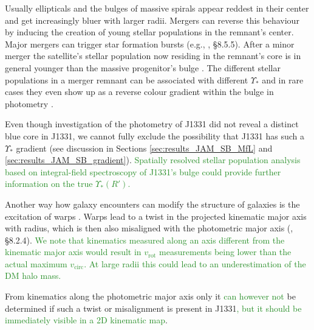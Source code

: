 \documentclass[useAMS,usenatbib]{mnras}
\newcommand{\NEW}[1]{\textcolor{ForestGreen}{#1}}
\newcommand{\OLD}[1]{}
\begin{document}
Usually ellipticals and the bulges of massive spirals appear reddest in their center and get increasingly bluer with larger radii. Mergers can reverse this behaviour by inducing the creation of young stellar populations in the remnant's center. Major mergers can trigger star formation bursts (e.g., \citealt{2008gady.book.....B}, \S 8.5.5). After a minor merger the satellite's stellar population now residing in the remnant's core is in general younger than the massive progenitor's bulge \citep{1996AJ....112..839C,2010MNRAS.404.1775T}. The different stellar populations in a merger remnant can be associated with different $\Upsilon_*$ and in rare cases they even show up as a reverse colour gradient within the bulge in photometry \citep{1990ApJ...361..381B, 1997ApJ...481..710C}.

Even though investigation of the photometry of J1331 did not reveal a distinct blue core in J1331, we cannot fully exclude the possibility that J1331 has such a $\Upsilon_*$ gradient (see discussion in Sections \ref{sec:results_JAM_SB_MfL} and \ref{sec:results_JAM_SB_gradient}). \NEW{Spatially resolved stellar population analysis based on integral-field spectroscopy of J1331's bulge could provide further information on the true $\Upsilon_*(R')$.}\OLD{In this case the restrictive assumption of a constant $\Upsilon_*$ in our JAM modelling could have lead to wrong conclusions about the DM distribution.}

Another way how galaxy encounters can modify the structure of galaxies is the excitation of warps \citep{1991wdir.book.....C,2013pss5.book..923S}. Warps lead to a twist in the projected kinematic major axis with radius, which is then also misaligned with the photometric major axis (\citealt{1998gaas.book.....B}, \S 8.2.4). \NEW{We note that kinematics measured along an axis different from the kinematic major axis would result in $v_\text{rot}$ measurements being lower than the actual maximum $v_\text{circ}$. At large radii this could lead to an underestimation of the DM halo mass.} 

From kinematics along the photometric major axis only it \OLD{cannot}\NEW{can however not} be determined if such a twist or misalignment is present in J1331\NEW{, but it should be immediately visible in a 2D kinematic map}.\OLD{ But if it were, our modelling assumption of axisymmetry would not be satisfied anymore.} \OLD{We note that kinematics measured along an axis different from the kinematic major axis would result in $v_\text{rot}$ measurements being lower than the actual maximum $v_\text{circ}$. At large radii this could lead to an underestimation of the DM halo mass.}
\end{document}
